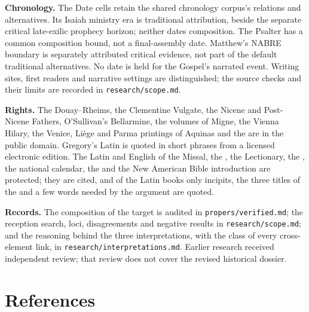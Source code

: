 {\textbf{Chronology.} The Date cells retain the shared chronology corpus's relations and alternatives. Its Isaiah ministry era is traditional attribution, beside the separate critical late-exilic prophecy horizon; neither dates composition. The Psalter has a common composition bound, not a final-assembly date. Matthew's NABRE boundary is separately attributed critical evidence, not part of the default traditional alternatives. No date is held for the Gospel's narrated event. Writing sites, first readers and narrative settings are distinguished; the source checks and their limits are recorded in \texttt{research/scope.md}.

\textbf{Rights.} The Douay--Rheims, the Clementine Vulgate, the Nicene and
Post-Nicene Fathers, O'Sullivan's Bellarmine, the volumes of Migne, the Vienna
Hilary, the Venice, Li\`ege and Parma printings of Aquinas and the
 are in the public domain. Gregory's Latin is
quoted in short phrases from a licensed electronic edition. The Latin and
English of the Missal, the , the Lectionary, the
, the national calendar, the  and
the New American Bible introduction are protected; they are cited, and of the
Latin books only incipits, the three titles of the  and a few words
needed by the argument are quoted.

\textbf{Records.} The composition of the target is audited in
\texttt{propers/verified.md}; the reception search, loci, disagreements and
negative results in \texttt{research/scope.md}; and the reasoning behind the
three interpretations, with the class of every cross-element link, in
\texttt{research/interpretations.md}. Earlier research received independent review; that review does not cover
the revised historical dossier.
\par}

\section*{References}
\label{sec:references}

